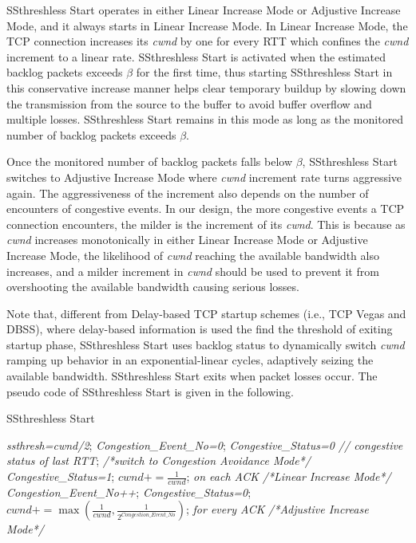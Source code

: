 \documentclass[12pt,onecolumn]{IEEEtran}
\begin{document}
SSthreshless Start operates in either Linear Increase Mode or Adjustive
Increase Mode, and it always starts in Linear Increase Mode. In Linear Increase
Mode, the TCP connection increases its \emph{cwnd} by one for every RTT which
confines the \emph{cwnd} increment to a linear rate. SSthreshless Start is
activated when the estimated backlog packets exceeds $\beta$ for the first time, thus
starting SSthreshless Start in this conservative increase manner helps clear
temporary buildup by slowing down the transmission from the source to the
buffer to avoid buffer overflow and multiple losses. SSthreshless Start remains
in this mode as long as the monitored number of backlog packets exceeds
$\beta$.

Once the monitored number of backlog packets falls below $\beta$, SSthreshless
Start switches to Adjustive Increase Mode where \emph{cwnd} increment rate
turns aggressive again. The aggressiveness of the increment also depends
on the number of encounters of congestive events. In our design, the more
congestive events a TCP connection encounters, the milder is the increment of
its \emph{cwnd}. This is because as \emph{cwnd} increases monotonically in
either Linear Increase Mode or Adjustive Increase Mode, the likelihood of
\emph{cwnd} reaching the available bandwidth also increases, and a milder
increment in \emph{cwnd} should be used to prevent it from overshooting the
available bandwidth causing serious losses.

Note that, different from Delay-based TCP startup schemes (i.e., TCP Vegas and
DBSS), where delay-based information is used the find the threshold of exiting
startup phase, SSthreshless Start uses backlog status to dynamically switch
\emph{cwnd} ramping up behavior in an exponential-linear cycles, adaptively
seizing the available bandwidth. SSthreshless Start exits when packet losses
occur. The pseudo code of SSthreshless Start is given in the following.

\begin{algorithm}
\caption{SSthreshless Start}
\label{alg1}
\begin{algorithmic}
    \STATE \emph{ssthresh=cwnd/2};
    \STATE \emph{Congestion\_Event\_No=0};
    \STATE \emph{Congestive\_Status=0 // congestive status of last RTT};
    \STATE \emph{/*switch to Congestion Avoidance Mode*/}
\ELSE
         \STATE \emph{Congestive\_Status=1};
         \STATE  $cwnd+=\frac{1}{cwnd}$; \emph{on each ACK}
         \STATE \emph{/*Linear Increase Mode*/}
    \ELSE
         \STATE \emph{Congestion\_Event\_No++};
         \STATE \emph{Congestive\_Status=0};
         \ENDIF
         \STATE $cwnd+=\max\left(\frac{1}{cwnd}, \frac{1}{2^{Congestion\_Event\_No}}\right)$;
         \STATE \emph{for every ACK}
         \STATE \emph{/*Adjustive Increase Mode*/}
    \ENDIF
\ENDIF

\end{algorithmic}
\end{algorithm}
\end{document}
